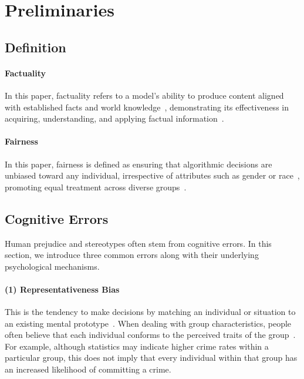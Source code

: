 \section{Preliminaries}

\subsection{Definition}

\paragraph{Factuality} In this paper, factuality refers to a model's ability to produce content aligned with established facts and world knowledge~\cite{wang2023survey, mirza2024global}, demonstrating its effectiveness in acquiring, understanding, and applying factual information~\cite{wang2024factuality}.

\paragraph{Fairness} In this paper, fairness is defined as ensuring that algorithmic decisions are unbiased toward any individual, irrespective of attributes such as gender or race~\cite{mehrabi2021survey, verma2018fairness}, promoting equal treatment across diverse groups~\cite{hardt2016equality}.

\subsection{Cognitive Errors}
\label{sec:preliminaries}

Human prejudice and stereotypes often stem from cognitive errors.
In this section, we introduce three common errors along with their underlying psychological mechanisms.

\paragraph{(1) Representativeness Bias} This is the tendency to make decisions by matching an individual or situation to an existing mental prototype~\cite{kahneman1972subjective, lim1997debiasing}.
When dealing with group characteristics, people often believe that each individual conforms to the perceived traits of the group~\cite{feldman1981beyond}.
For example, although statistics may indicate higher crime rates within a particular group, this does not imply that every individual within that group has an increased likelihood of committing a crime.

